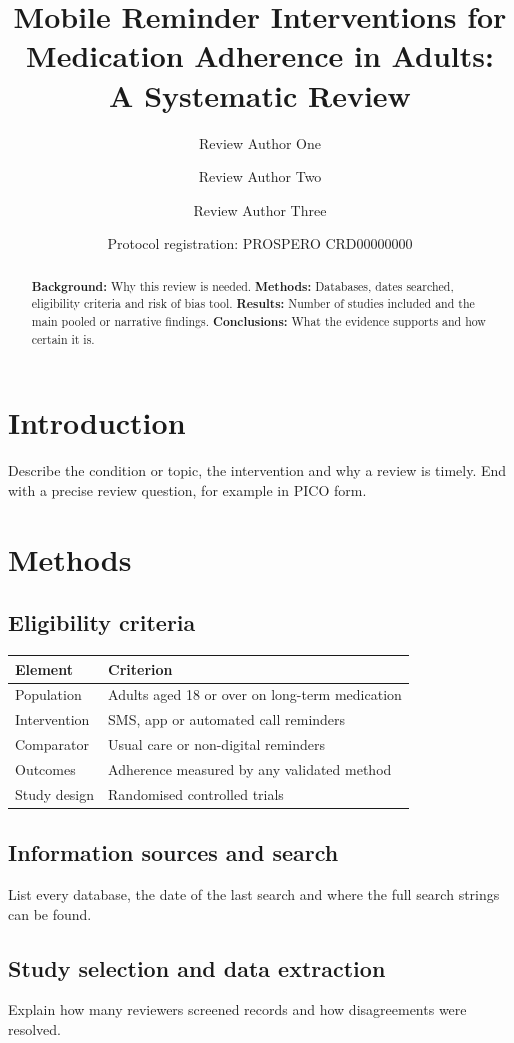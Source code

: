 \documentclass[11pt,a4paper]{article}
\title{Mobile Reminder Interventions for Medication Adherence in Adults:\\ A Systematic Review}
\author{Review Author One \and Review Author Two \and Review Author Three}
\date{Protocol registration: PROSPERO CRD00000000}
\begin{document}
\maketitle

\begin{abstract}
\noindent\textbf{Background:} Why this review is needed.
\textbf{Methods:} Databases, dates searched, eligibility criteria and risk of bias tool.
\textbf{Results:} Number of studies included and the main pooled or narrative findings.
\textbf{Conclusions:} What the evidence supports and how certain it is.
\end{abstract}

\section{Introduction}
Describe the condition or topic, the intervention and why a review is timely.
End with a precise review question, for example in PICO form.

\section{Methods}
\subsection{Eligibility criteria}
\begin{tabularx}{\linewidth}{@{}lX@{}}
\toprule
Element & Criterion \\
\midrule
Population & Adults aged 18 or over on long-term medication \\
Intervention & SMS, app or automated call reminders \\
Comparator & Usual care or non-digital reminders \\
Outcomes & Adherence measured by any validated method \\
Study design & Randomised controlled trials \\
\bottomrule
\end{tabularx}

\subsection{Information sources and search}
List every database, the date of the last search and where the full search strings can be found.

\subsection{Study selection and data extraction}
Explain how many reviewers screened records and how disagreements were resolved.
\end{document}
